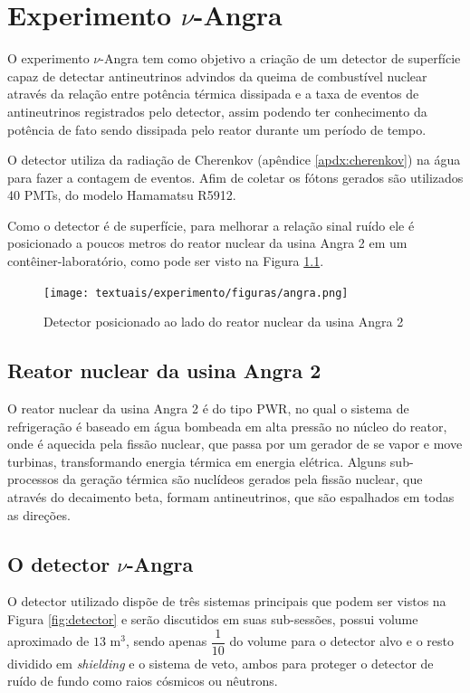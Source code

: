 \chapter{Experimento $\nu$-Angra}\label{cap:experimento}
\vspace{-2cm}

O experimento $\nu$-Angra tem como objetivo a criação de um detector de superfície capaz de detectar antineutrinos advindos da queima de combustível nuclear através da relação entre potência térmica dissipada e a taxa de eventos de antineutrinos registrados pelo detector, assim podendo ter conhecimento da potência de fato sendo dissipada pelo reator durante um período de tempo.

O detector utiliza da radiação de Cherenkov (apêndice \ref{apdx:cherenkov}) na água para fazer a contagem de eventos. Afim de coletar os fótons gerados são utilizados 40 PMTs, do modelo Hamamatsu R5912.

Como o detector é de superfície, para melhorar a relação sinal ruído ele é posicionado a poucos metros do reator nuclear da usina Angra 2 em um contêiner-laboratório, como pode ser visto na Figura \ref{fig:angra}.

\begin{figure}[H]
	\centering
	\texttt{[image: textuais/experimento/figuras/angra.png]}
	\caption{Detector posicionado ao lado do reator nuclear da usina Angra 2}
	\label{fig:angra}
\end{figure}

\section{Reator nuclear da usina Angra 2}

O reator nuclear da usina Angra 2 é do tipo \ac{PWR}, no qual o sistema de refrigeração é baseado em água bombeada em alta pressão no núcleo do reator, onde é aquecida pela fissão nuclear, que passa por um gerador de se vapor e move turbinas, transformando energia térmica em energia elétrica. Alguns sub-processos da geração térmica são nuclídeos gerados pela fissão nuclear, que através do decaimento beta, formam antineutrinos, que são espalhados em todas as direções.

\section{O detector $\nu$-Angra} \label{sec:detector}

O detector utilizado dispõe de três sistemas principais que podem ser vistos na Figura \ref{fig:detector} e serão discutidos em suas sub-sessões, possui volume aproximado de $13$ m$^3$, sendo apenas $\dfrac{1}{10}$ do volume para o detector alvo e o resto dividido em \emph{shielding} e o sistema de veto, ambos para proteger o detector de ruído de fundo como raios cósmicos ou nêutrons.

